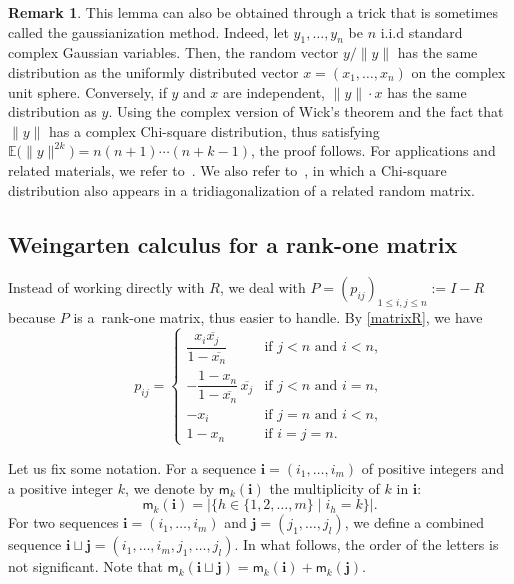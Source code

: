 \documentclass[pdftex]{sigma}
\numberwithin{equation}{section}
\theoremstyle{definition}
\newtheorem{Remark}[Theorem]{Remark}
\newcommand{\mult}{\mathsf{m}}
\begin{document}
\begin{Remark} \label{rem:gaussianization}
 This lemma can also be obtained through a trick that is sometimes
called the gaussianization method.
Indeed, let
$y_1,\dots, y_n$ be $n$ i.i.d standard complex Gaussian variables. Then, the random vector
$y/\|y\|$ has the same distribution as
the uniformly distributed vector
$x=(x_1,\dots, x_n)$ on the complex unit sphere.
Conversely, if $y$ and $x$ are independent,
$\|y\|\cdot x$ has the same distribution as $y$.
Using the complex version of Wick's theorem and the fact that~$\|y\|$ has a complex Chi-square distribution, thus satisfying
$\mathbb{E}\bigl(\|y \|^{2k}\bigr)=n(n+1)\cdots (n+k-1)$,
the proof follows.
For applications and related materials, we refer to~\cite[Theorem 6.1]{BanicaCollins2008}.
We also refer to~\cite{MR1936554}, in which a Chi-square distribution also appears in a tridiagonalization of a related random matrix.
\end{Remark}

\subsection{Weingarten calculus for a rank-one matrix}

Instead of working directly with $R$,
we deal with $P =(p_{ij})_{1 \le i,j \le n}:=I-R$ because $P$ is a~rank-one matrix, thus easier to handle.
By \eqref{matrixR}, we have
\begin{equation} \label{matrixP}
p_{ij}= \begin{cases}
\dfrac{x_{i}\overline{x_{j}}}{1-\overline{x_{n}}} &\text{if $j<n$ and $i <n$}, \\
-\dfrac{1-x_{n}}{1-\overline{x_{n}}}\, \overline{x_{j}} &\text{if $j<n$ and $i=n$},\\
-x_i & \text{if $j=n$ and $i < n$}, \\
1-x_n & \text{if $i=j=n$}.
\end{cases}
\end{equation}

Let us fix some notation.
For a sequence $\bm{i}=(i_1,\dots, i_m)$ of positive integers and a positive integer $k$,
we denote by $\mult_k(\bm{i})$ the multiplicity of $k$ in $\bm{i}$:
\[
\mult_k (\bm{i})= |\{h \in \{1,2,\dots, m\} \mid i_h=k\}|.
\]
For two sequences
$\bm{i}=(i_1,\dots, i_m)$ and $\bm{j}=(j_1,\dots, j_l)$,
we define a combined sequence
$\bm{i} \sqcup \bm{j} = (i_1,\dots, i_m, j_1,\dots,j_l)$.
In what follows, the order of the letters is not significant.
Note that $\mult_k(\bm{i} \sqcup \bm{j})= \mult_k(\bm{i})+ \mult_k(\bm{j})$.
\end{document}
